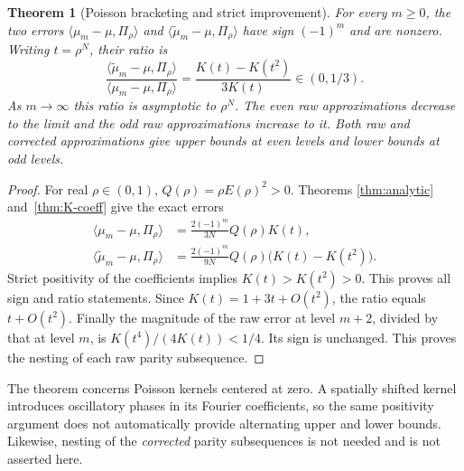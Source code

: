 \documentclass[11pt,a4paper]{article}
\numberwithin{equation}{section}
\newtheorem{theorem}{Theorem}[section]
\theoremstyle{definition}
\theoremstyle{remark}
\newcommand{\mt}{\widetilde\mu}
\newcommand{\pair}[2]{\langle #1,#2\rangle}
\begin{document}
\begin{theorem}[Poisson bracketing and strict improvement]
\label{thm:poisson}
For every $m\ge0$, the two errors
$\pair{\mu_m-\mu}{\Pi_\rho}$ and
$\pair{\mt_m-\mu}{\Pi_\rho}$ have sign $(-1)^m$ and are nonzero.
Writing $t=\rho^N$, their ratio is
\begin{equation}
 \frac{\pair{\mt_m-\mu}{\Pi_\rho}}
      {\pair{\mu_m-\mu}{\Pi_\rho}}
 =\frac{K(t)-K(t^2)}{3K(t)}\in(0,1/3).
 \label{eq:poisson-ratio}
\end{equation}
As $m\to\infty$ this ratio is asymptotic to $\rho^N$.
The even raw approximations decrease to the limit and the odd raw approximations
increase to it. Both raw and corrected approximations give upper bounds at even
levels and lower bounds at odd levels.
\end{theorem}
\begin{proof}
For real $\rho\in(0,1)$, $Q(\rho)=\rho E(\rho)^2>0$. Theorems
\ref{thm:analytic} and~\ref{thm:K-coeff} give the exact errors
\begin{align}
 \pair{\mu_m-\mu}{\Pi_\rho}
 &=\frac{2(-1)^m}{3N}Q(\rho)K(t),\label{eq:raw-poisson}\\
 \pair{\mt_m-\mu}{\Pi_\rho}
 &=\frac{2(-1)^m}{9N}Q(\rho)\bigl(K(t)-K(t^2)\bigr).
 \label{eq:corrected-poisson}
\end{align}
Strict positivity of the coefficients implies $K(t)>K(t^2)>0$. This proves
all sign and ratio statements. Since $K(t)=1+3t+O(t^2)$, the ratio equals
$t+O(t^2)$. Finally the magnitude of the raw error at level $m+2$, divided by
that at level $m$, is $K(t^4)/(4K(t))<1/4$. Its sign is unchanged. This proves
the nesting of each raw parity subsequence.
\end{proof}

The theorem concerns Poisson kernels centered at zero. A spatially shifted kernel
introduces oscillatory phases in its Fourier coefficients, so the same positivity
argument does not automatically provide alternating upper and lower bounds.
Likewise, nesting of the \emph{corrected} parity subsequences is not needed and
is not asserted here.

\begin{table}[tb]
\centering\small

\caption{Absolute errors for $\Pi_{4/5}$. Values were evaluated with 160-digit
arithmetic from the exact factorizations and independently checked against
finite Laurent coefficients. Rounded decimal values are illustrations, not
interval-arithmetic certificates. The signs are rigorously $(-1)^m$.}
\label{tab:poisson}
\end{table}
\end{document}
